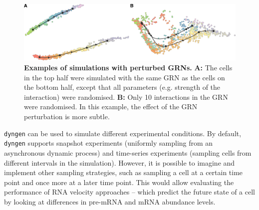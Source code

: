 \begin{figure}[ht]
	\centering
	\includegraphics[width=\LARgefigure]{fig/usecases} 
	\caption{
		\textbf{Examples of simulations with perturbed GRNs.}  
		\textbf{A:} The cells in the top half were simulated with the same GRN as the cells on the bottom half, except that all parameters (e.g. strength of the interaction) were randomised.
		\textbf{B:} Only 10 interactions in the GRN were randomised. In this example, the effect of the GRN perturbation is more subtle.
	}
	\label{fig:usecases}
\end{figure}

\texttt{dyngen} can be used to simulate different experimental conditions. By default, \texttt{dyngen} supports snapshot experiments (uniformly sampling from an asynchronous dynamic process) and time-series experiments (sampling cells from different intervals in the simulation). 
However, it is possible to imagine and implement other sampling strategies, such as sampling a cell at a certain time point and once more at a later time point. This would allow evaluating the performance of RNA velocity approaches -- which predict the future state of a cell by looking at differences in pre-mRNA and mRNA abundance levels.




